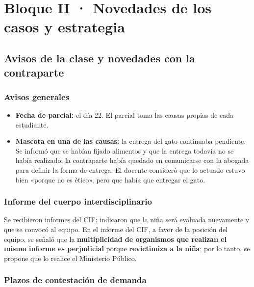 \documentclass[12pt,oneside]{book}
\begin{document}
\chapter[Novedades y estrategia]{Bloque II · Novedades de los casos y estrategia}

\section{Avisos de la clase y novedades con la contraparte}

\subsection{Avisos generales}

\begin{itemize}
    \item \textbf{Fecha de parcial:} el día 22. El parcial toma las causas propias de cada estudiante.
    \item \textbf{Mascota en una de las causas:} la entrega del gato continuaba pendiente. Se informó que se habían fijado alimentos y que la entrega todavía no se había realizado; la contraparte había quedado en comunicarse con la abogada para definir la forma de entrega. El docente consideró que lo actuado estuvo bien «porque no es ético», pero que había que entregar el gato.
\end{itemize}


\subsection{Informe del cuerpo interdisciplinario}

Se recibieron informes del CIF: indicaron que la niña será evaluada nuevamente y que se convocó al equipo. En el informe del CIF, a favor de la posición del equipo, se señaló que la \textbf{multiplicidad de organismos que realizan el mismo informe es perjudicial} porque \textbf{revictimiza a la niña}; por lo tanto, se propone que lo realice el Ministerio Público.

\subsection{Plazos de contestación de demanda}
\end{document}
